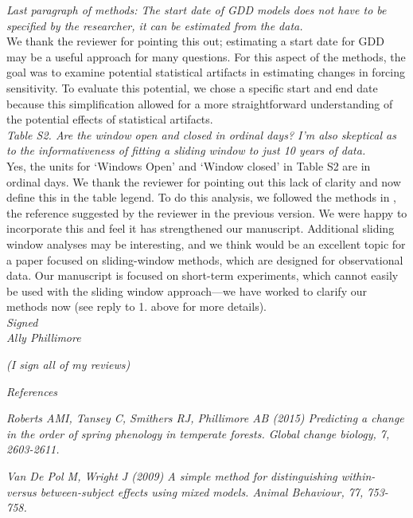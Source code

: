 \documentclass{article}
\begin{document}
\emph{Last paragraph of methods: The start date of GDD models does not have to be specified by the
researcher, it can be estimated from the data.}\\

We thank the reviewer for pointing this out; estimating a start date for GDD \citep[as done in][]{roberts2015} may be a useful approach for many questions. For this aspect of the methods, the goal was to examine potential statistical artifacts in estimating changes in forcing sensitivity. To evaluate this potential, we chose a specific start and end date because this simplification allowed for a more straightforward understanding of the potential effects of statistical artifacts.\\

 \emph{Table S2. Are the window open and closed in ordinal days? I'm also skeptical as to the informativeness of fitting a sliding window to just 10 years of data.}\\

Yes, the units for `Windows Open' and `Window closed' in Table S2 are in ordinal days. We thank the reviewer for pointing out this lack of clarity and now define this in the table legend. To do this analysis, we followed the methods in \citet{simmonds2019}, the reference suggested by the reviewer in the previous version. We were happy to incorporate this and feel it has strengthened our manuscript. Additional sliding window analyses may be interesting, and we think would be an excellent topic for a paper focused on sliding-window methods, which are designed for observational data. Our manuscript is focused on short-term experiments, which cannot easily be used with the sliding window approach---we have worked to clarify our methods now (see reply to 1. above for more details).\\

 \emph{Signed}\\
 \emph{Ally Phillimore}

 \emph{(I sign all of my reviews)}

 \emph{References}

\emph{Roberts AMI, Tansey C, Smithers RJ, Phillimore AB (2015) Predicting a change in the order of spring
phenology in temperate forests. Global change biology, 7, 2603-2611.}

 \emph{Van De Pol M, Wright J (2009) A simple method for distinguishing within- versus between-subject effects
using mixed models. Animal Behaviour, 77, 753-758.}\\
\\ 
\end{document}
